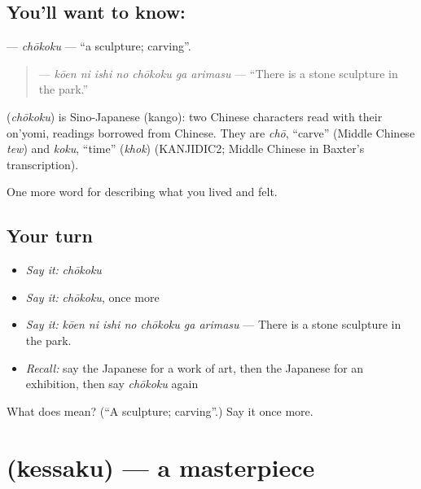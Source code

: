 \subsection*{You'll want to know: }
\textbf{} — \emph{chōkoku} — \textquotedblleft{}a sculpture; carving\textquotedblright{}.

\begin{quote}
\textbf{   } — \emph{kōen ni ishi no chōkoku ga arimasu} — \textquotedblleft{}There is a stone sculpture in the park.\textquotedblright{}
\end{quote}

\begin{cousinweb}
\textbf{} (\emph{chōkoku}) is Sino-Japanese (kango): two Chinese characters read with their on'yomi, readings borrowed from Chinese. They are \emph{chō}, \textquotedblleft{}carve\textquotedblright{} (Middle Chinese \emph{tew}) and \emph{koku}, \textquotedblleft{}time\textquotedblright{} (\emph{khok}) (KANJIDIC2; Middle Chinese in Baxter's transcription).
\end{cousinweb}

\begin{grammarlens}[title={What you've built}]
One more word for describing what you lived and felt.
\end{grammarlens}

\subsection*{Your turn}
\begin{itemize}
\raggedright
  \item \emph{Say it:} \emph{chōkoku}
  \item \emph{Say it:} \emph{chōkoku}, once more
  \item \emph{Say it:} \emph{kōen ni ishi no chōkoku ga arimasu} — There is a stone sculpture in the park.
  \item \emph{Recall:} say the Japanese for a work of art, then the Japanese for an exhibition, then say \emph{chōkoku} again
\end{itemize}

\begin{tcolorbox}[breakable,colback=teal!4,colframe=teal!35!black,title={Before you move on}]
What does  mean? (\textquotedblleft{}A sculpture; carving\textquotedblright{}.) Say it once more.
\end{tcolorbox}
\section[\texorpdfstring{\ja{けっさく} (kessaku)}{けっさく (kessaku)}]{ (kessaku) — a masterpiece}

